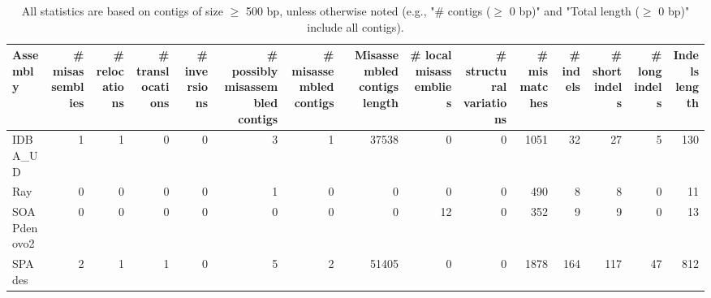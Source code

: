\documentclass[12pt,a4paper]{article}
\begin{document}
\begin{table}[ht]
\begin{center}
\caption{All statistics are based on contigs of size $\geq$ 500 bp, unless otherwise noted (e.g., "\# contigs ($\geq$ 0 bp)" and "Total length ($\geq$ 0 bp)" include all contigs).}
\begin{tabular}{|l*{14}{|r}|}
\hline
Assembly & \# misassemblies &     \# relocations &     \# translocations &     \# inversions & \# possibly misassembled contigs & \# misassembled contigs & Misassembled contigs length & \# local misassemblies & \# structural variations & \# mismatches & \# indels &     \# short indels &     \# long indels & Indels length \\ \hline
IDBA\_UD & 1 & 1 & 0 & 0 & 3 & 1 & 37538 & 0 & 0 & 1051 & 32 & 27 & 5 & 130 \\ \hline
Ray & 0 & 0 & 0 & 0 & 1 & 0 & 0 & 0 & 0 & 490 & 8 & 8 & 0 & 11 \\ \hline
SOAPdenovo2 & 0 & 0 & 0 & 0 & 0 & 0 & 0 & 12 & 0 & 352 & 9 & 9 & 0 & 13 \\ \hline
SPAdes & 2 & 1 & 1 & 0 & 5 & 2 & 51405 & 0 & 0 & 1878 & 164 & 117 & 47 & 812 \\ \hline
\end{tabular}
\end{center}
\end{table}
\end{document}

